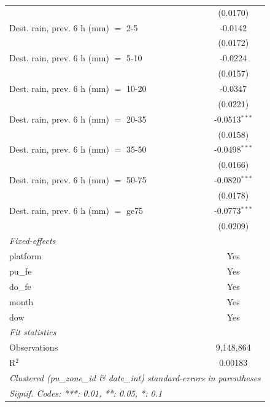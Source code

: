 \begin{tabular}{lc}
                                                 & (0.0170)\\   
   Dest. rain, prev. 6 h (mm) $=$ 2-5            & -0.0142\\   
                                                 & (0.0172)\\   
   Dest. rain, prev. 6 h (mm) $=$ 5-10           & -0.0224\\   
                                                 & (0.0157)\\   
   Dest. rain, prev. 6 h (mm) $=$ 10-20          & -0.0347\\   
                                                 & (0.0221)\\   
   Dest. rain, prev. 6 h (mm) $=$ 20-35          & -0.0513$^{***}$\\   
                                                 & (0.0158)\\   
   Dest. rain, prev. 6 h (mm) $=$ 35-50          & -0.0498$^{***}$\\   
                                                 & (0.0166)\\   
   Dest. rain, prev. 6 h (mm) $=$ 50-75          & -0.0820$^{***}$\\   
                                                 & (0.0178)\\   
   Dest. rain, prev. 6 h (mm) $=$ ge75           & -0.0773$^{***}$\\   
                                                 & (0.0209)\\   
   \midrule
   \emph{Fixed-effects}\\
   platform                                      & Yes\\  
   pu\_fe                                        & Yes\\  
   do\_fe                                        & Yes\\  
   month                                         & Yes\\  
   dow                                           & Yes\\  
   \midrule
   \emph{Fit statistics}\\
   Observations                                  & 9,148,864\\  
   R$^2$                                         & 0.00183\\  
   \midrule \midrule
   \multicolumn{2}{l}{\emph{Clustered (pu\_zone\_id \& date\_int) standard-errors in parentheses}}\\
   \multicolumn{2}{l}{\emph{Signif. Codes: ***: 0.01, **: 0.05, *: 0.1}}\\
\end{tabular}
 
